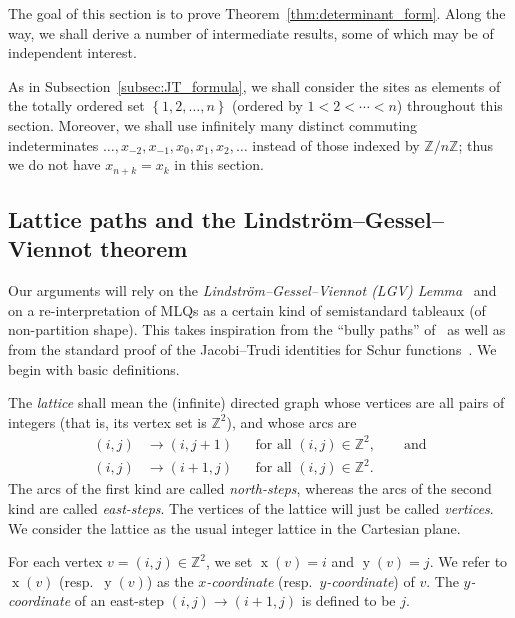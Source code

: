 \documentclass[reqno]{amsart}
\newcommand{\0}{\phantom{c}}
\DeclareMathOperator{\xcoord}{x} %
\DeclareMathOperator{\ycoord}{y} %
\newcommand{\ZZ}{\mathbb{Z}}
\newenvironment{verlong}{}{}
\newcommand{\set}[1]{\left\{ #1 \right\}}
\newcommand{\defn}[1]{{\color{darkred}\emph{#1}}} %
\theoremstyle{plain}
\theoremstyle{definition}
\numberwithin{equation}{section}
\begin{document}

The goal of this section is to prove Theorem~\ref{thm:determinant_form}.
Along the way, we shall derive a number of intermediate results, some of which may be of independent interest.

As in Subsection~\ref{subsec:JT_formula}, we shall consider the sites as elements of the totally ordered set $\set{1, 2, \ldots, n}$ (ordered by $1 < 2 < \cdots < n$) throughout this section.
Moreover, we shall use infinitely many distinct commuting indeterminates $\ldots, x_{-2}, x_{-1}, x_0, x_1, x_2, \ldots$ instead of those indexed by $\ZZ/n\ZZ$; thus we do not have $x_{n+k} = x_k$ in this section.

\subsection{Lattice paths and the Lindstr\"{o}m--Gessel--Viennot theorem}

Our arguments will rely on the \defn{Lindstr\"om--Gessel--Viennot (LGV) Lemma}~\cite{GV85,Lindstrom73} and on a re-interpretation of MLQs as a certain kind of semistandard tableaux (of non-partition shape).
This takes inspiration from the ``bully paths'' of~\cite{AasLin17} as well as from the standard proof of the Jacobi--Trudi identities for Schur functions~\cite[First proof of Theorem 7.16.1]{Stanley-EC2}.
We begin with basic definitions.

The \defn{lattice} shall mean the (infinite) directed graph whose vertices are
all pairs of integers (that is, its vertex set is $\ZZ^2$), and whose arcs are
\begin{align*}
(i,j) & \to (i,j+1) & & \text{for all } (i,j) \in \ZZ^2, \qquad \text{and} \\
(i,j) & \to (i+1,j) & & \text{for all } (i,j) \in \ZZ^2.
\end{align*}
The arcs of the first kind are called \defn{north-steps}, whereas the arcs of
the second kind are called \defn{east-steps}.
\begin{verlong}
The vertices of the lattice will just be called \defn{vertices}.
\end{verlong}
We consider the lattice as the usual integer lattice in the Cartesian plane.

For each vertex $v = (i,j) \in \ZZ^2$, we set $\xcoord(v) = i$ and $\ycoord(v) = j$.
We refer to $\xcoord(v)$ (resp.~$\ycoord(v)$) as the \defn{$x$-coordinate} (resp.~\defn{$y$-coordinate}) of $v$.
The \defn{$y$-coordinate} of an east-step $(i,j) \to (i+1, j)$ is defined to be $j$.
\end{document}
